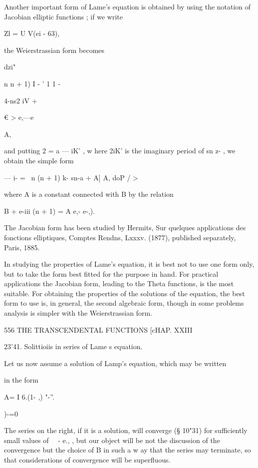 {{{{Another important form of Lame's equation is obtained by using the
notation of Jacobian elliptic functions ; if we write

Zl = U V(ei - 63),

the Weierstrassian form becomes



dzi"



n n + 1) I - ' 1 1 -



4-ns2 iV +



€ > e,—e



A,



and putting 2 = a — iK' , w here 2iK' is the imaginary period of sn z-
, we obtain the simple form

— i- = \ n (n + 1) k- sn-a + A] A, doP / >

where A is a constant connected with B by the relation

B + e-iii (n + 1) = A e,- e-,).

The Jacobian form has been studied by Hermits, Sur quelques
applications des fonctions elliptiques, Comptes Rendns, Lxxxv. (1877),
published separately, Paris, 1885.

In studying the properties of Lame's equation, it is best not to use
one form only, but to take the form best fitted for the purpose in
hand. For practical applications the Jacobian form, leading to the
Theta functions, is the most suitable. For obtaining the properties of
the solutions of the equation, the best form to use is, in general,
the second algebraic form, though in some problems analysis is simpler
with the Weierstrassian form.



556 THE TRANSCENDENTAL FUNCTIONS [cHAP. XXIII

23'41. Solittioiis in series of Lame s equation.

Let us now assume a solution of Lamp's equation, which may be written

in the form

A= I 6.(1- ,) "-''.

)-=0

The series on the right, if it is a solution, will converge (§ 10"31)
for sufficiently small values of \ \ - e., , but our object will be
not the discussion of the convergence but the choice of B in such a w
ay that the series may terminate, so that considerations of
convergence will be superfluous.

}}}}
